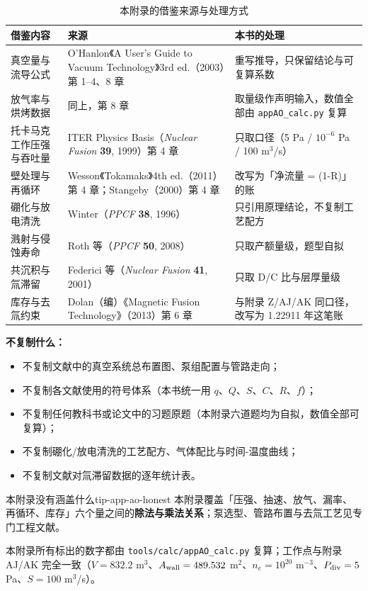 \begin{table}[htbp]
\centering
\caption{本附录的借鉴来源与处理方式}
\label{tab:app-ao-source}
{\small
\begin{tabular}{p{3.4cm}p{4.6cm}p{6.4cm}}
\toprule
借鉴内容 & 来源 & 本书的处理 \\
\midrule
真空量与流导公式 & O'Hanlon《A User's Guide to Vacuum Technology》3rd ed.（2003）第 1--4、8 章 & 重写推导，只保留结论与可复算系数 \\
放气率与烘烤数据 & 同上，第 8 章 & 取量级作声明输入，数值全部由 \texttt{appAO\_calc.py} 复算 \\
托卡马克工作压强与吞吐量 & ITER Physics Basis（\textit{Nuclear Fusion} \textbf{39}, 1999）第 4 章 & 只取口径（5 Pa / $10^{-6}$ Pa / 100 m$^3$/s） \\
壁处理与再循环 & Wesson《Tokamaks》4th ed.（2011）第 4 章；Stangeby（2000）第 4 章 & 改写为「净流量 = (1-R)」的账 \\
硼化与放电清洗 & Winter（\textit{PPCF} \textbf{38}, 1996） & 只引用原理结论，不复制工艺配方 \\
溅射与侵蚀寿命 & Roth 等（\textit{PPCF} \textbf{50}, 2008） & 只取产额量级，题型自拟 \\
共沉积与氚滞留 & Federici 等（\textit{Nuclear Fusion} \textbf{41}, 2001） & 只取 D/C 比与层厚量级 \\
库存与去氚约束 & Dolan（编）《Magnetic Fusion Technology》（2013）第 6 章 & 与附录 Z/AJ/AK 同口径，改写为 1.22911 年这笔账 \\
\bottomrule
\end{tabular}}
\end{table}

\textbf{不复制什么：}

\begin{itemize}
\item 不复制文献中的真空系统总布置图、泵组配置与管路走向；
\item 不复制各文献使用的符号体系（本书统一用 $q$、$Q$、$S$、$C$、$R$、$f$）；
\item 不复制任何教科书或论文中的习题原题（本附录六道题均为自拟，数值全部可复算）；
\item 不复制硼化/放电清洗的工艺配方、气体配比与时间-温度曲线；
\item 不复制文献对氚滞留数据的逐年统计表。
\end{itemize}

\begin{tip}{本附录没有涵盖什么}{tip-app-ao-honest}
本附录覆盖「压强、抽速、放气、漏率、再循环、库存」六个量之间的\textbf{除法与乘法关系}；泵选型、管路布置与去氚工艺见专门工程文献。
\end{tip}

本附录所有标出的数字都由 \texttt{tools/\allowbreak{}calc/\allowbreak{}appAO\_calc.py} 复算；工作点与附录 AJ/AK 完全一致（$V=832.2$ m$^3$、$A_{\rm wall}=489.532$ m$^2$、$n_e=10^{20}$ m$^{-3}$、$P_{\rm div}=5$ Pa、$S=100$ m$^3$/s）。
\endgroup
